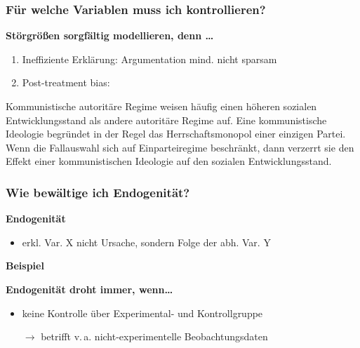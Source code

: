 \documentclass{beamer}
\begin{document}
\begin{frame}
\frametitle{Für welche Variablen muss ich kontrollieren?}
\textbf{Störgrößen sorgfältig modellieren, denn \dots}
\begin{enumerate}
  \item Ineffiziente Erklärung: Argumentation mind. nicht sparsam
  \item Post-treatment bias: 
\end{enumerate}

Kommunistische autoritäre Regime weisen häufig
einen höheren sozialen Entwicklungsstand als andere
autoritäre Regime auf. Eine kommunistische
Ideologie begründet in der Regel das Herrschaftsmonopol
einer einzigen Partei. Wenn die Fallauswahl sich auf
Einparteiregime beschränkt, dann verzerrt sie den
Effekt einer kommunistischen Ideologie auf den sozialen
Entwicklungsstand.
\end{frame}

\begin{frame}
\frametitle{Wie bewältige ich Endogenität?}

\textbf{Endogenität}
\begin{itemize}
  \item erkl. Var. X nicht Ursache, sondern Folge der abh. Var. Y
\end{itemize}

\textbf{Beispiel}
\begin{figure}
  \centering
\end{figure}

\textbf{Endogenität droht immer, wenn\dots}
\begin{itemize}
  \item keine Kontrolle über Experimental- und Kontrollgruppe
  \item [$\rightarrow$] betrifft v.\,a. nicht-experimentelle Beobachtungsdaten
\end{itemize}
\end{frame}
\end{document}

